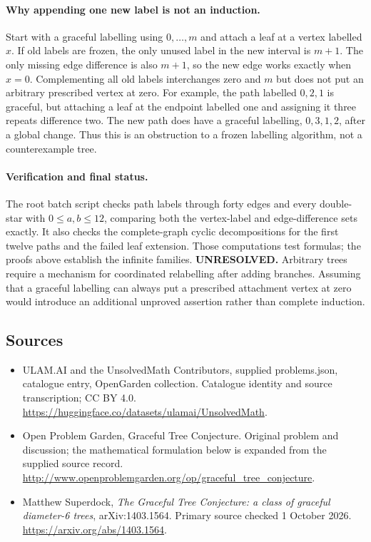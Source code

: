 \documentclass[11pt,a4paper]{article}
\begin{document}
\paragraph{Why appending one new label is not an induction.}
Start with a graceful labelling using $0,\ldots,m$ and attach a leaf at
a vertex labelled $x$. If old labels are frozen, the only unused label
in the new interval is $m+1$. The only missing edge difference is also
$m+1$, so the new edge works exactly when $x=0$. Complementing all old
labels interchanges zero and $m$ but does not put an arbitrary prescribed
vertex at zero. For example, the path labelled $0,2,1$ is graceful, but
attaching a leaf at the endpoint labelled one and assigning it three
repeats difference two. The new path does have a graceful labelling,
$0,3,1,2$, after a global change. Thus this is an obstruction to a frozen
labelling algorithm, not a counterexample tree.

\paragraph{Verification and final status.}
The root batch script checks path labels through forty edges and every
double-star with $0\le a,b\le12$, comparing both the vertex-label and
edge-difference sets exactly. It also checks the complete-graph cyclic
decompositions for the first twelve paths and the failed leaf extension.
Those computations test formulas; the proofs above establish the infinite
families. \textbf{UNRESOLVED.} Arbitrary trees require a mechanism for
coordinated relabelling after adding branches. Assuming that a graceful
labelling can always put a prescribed attachment vertex at zero would
introduce an additional unproved assertion rather than complete induction.

\subsection{Sources}
\begin{itemize}
\item[S1] ULAM.AI and the UnsolvedMath Contributors, supplied problems.json, catalogue entry, OpenGarden collection. Catalogue identity and source transcription; CC BY 4.0.
\url{https://huggingface.co/datasets/ulamai/UnsolvedMath}.
\item[S2] Open Problem Garden, Graceful Tree Conjecture. Original problem and discussion; the mathematical formulation below is expanded from the supplied source record.
\url{http://www.openproblemgarden.org/op/graceful_tree_conjecture}.
\item[R1] Matthew Superdock, \emph{The Graceful Tree Conjecture:
a class of graceful diameter-6 trees}, arXiv:1403.1564.
Primary source checked 1 October 2026.
\url{https://arxiv.org/abs/1403.1564}.
\end{itemize}
\end{document}
